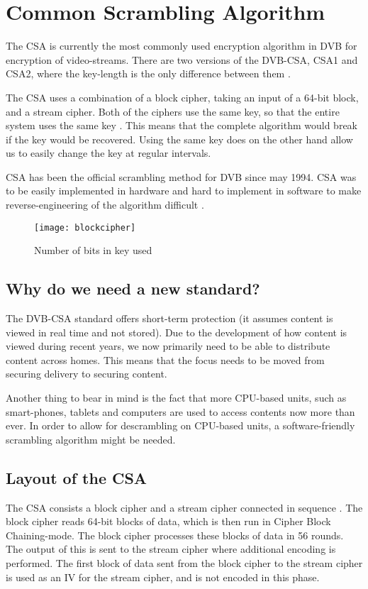 \chapter{Common Scrambling Algorithm} \label{ch:CSA}
The CSA is currently the most commonly used encryption algorithm in DVB 
for encryption of video-streams. There are two versions of the DVB-CSA, 
CSA1 and CSA2, where the key-length is the only difference between them 
\citep[p. 23]{DVBScene:2013}. 

The CSA uses a combination of a block cipher, taking an input of a 
64-bit block, and a stream cipher. Both of the ciphers use the same 
key, so that the entire system uses the same key 
\citep[pp. 271--272]{WeiLi:2007}. This means that the complete 
algorithm would break if the key would be recovered. Using the same key 
does on the other hand allow us to easily change the key at regular 
intervals. 

CSA has been the official scrambling method for DVB since may 1994. CSA 
was to be easily implemented in hardware and hard to implement in 
software to make reverse-engineering of the algorithm difficult 
\citep{DVBScene:2013}.

\begin{figure}
  \begin{center}
    \texttt{[image: blockcipher]}
  \end{center}
  \caption{Number of bits in key used}
  \label{fig:blockcipher}
\end{figure}

\section{Why do we need a new standard?}
The DVB-CSA standard offers short-term protection (it assumes content 
is viewed in real time and not stored). Due to the development of how 
content is viewed during recent years, we now primarily need to be able 
to distribute content across homes. This means that the focus needs to 
be moved from securing delivery to securing content. \citep{Farncombe}

Another thing to bear in mind is the fact that more CPU-based units, 
such as smart-phones, tablets and computers are used to access contents 
now more than ever. In order to allow for descrambling on CPU-based 
units, a software-friendly scrambling algorithm might be needed.

\section{Layout of the CSA}
The CSA consists a block cipher and a stream cipher connected in 
sequence \citep[p. 271]{WeiLi:2007}. The block cipher reads 64-bit 
blocks of data, which is then run in Cipher Block Chaining-mode. The 
block cipher processes these blocks of data in 56 rounds. The output of 
this is sent to the stream cipher where additional encoding is 
performed. The first block of data sent from the block cipher to the 
stream cipher is used as an IV for the stream cipher, and is not 
encoded in this phase. \citep{DVBAnalysis:2006}

